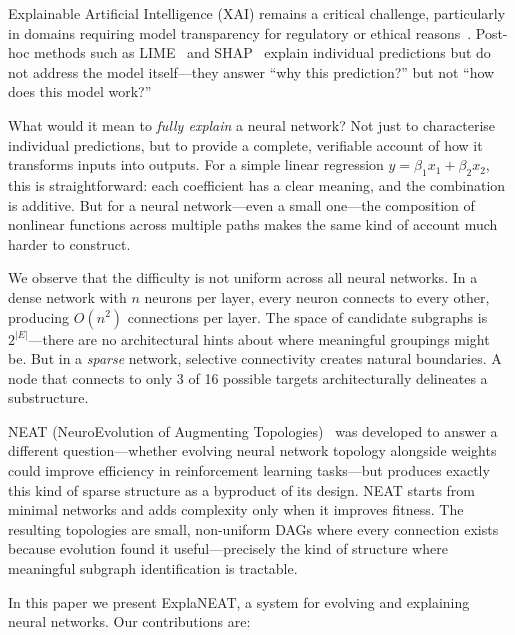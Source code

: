 \documentclass[11pt]{article}
\begin{document}
Explainable Artificial Intelligence (XAI) remains a critical challenge, particularly in domains requiring model transparency for regulatory or ethical reasons~\cite{doshi2017towards,guidotti2018survey}. Post-hoc methods such as LIME~\cite{ribeiro2016why} and SHAP~\cite{lundberg2017unified} explain individual predictions but do not address the model itself---they answer ``why this prediction?'' but not ``how does this model work?''

What would it mean to \emph{fully explain} a neural network? Not just to characterise individual predictions, but to provide a complete, verifiable account of how it transforms inputs into outputs. For a simple linear regression $y = \beta_1 x_1 + \beta_2 x_2$, this is straightforward: each coefficient has a clear meaning, and the combination is additive. But for a neural network---even a small one---the composition of nonlinear functions across multiple paths makes the same kind of account much harder to construct.

We observe that the difficulty is not uniform across all neural networks. In a dense network with $n$ neurons per layer, every neuron connects to every other, producing $O(n^2)$ connections per layer. The space of candidate subgraphs is $2^{|E|}$---there are no architectural hints about where meaningful groupings might be. But in a \emph{sparse} network, selective connectivity creates natural boundaries. A node that connects to only 3 of 16 possible targets architecturally delineates a substructure.

NEAT (NeuroEvolution of Augmenting Topologies)~\cite{stanley2002evolving} was developed to answer a different question---whether evolving neural network topology alongside weights could improve efficiency in reinforcement learning tasks---but produces exactly this kind of sparse structure as a byproduct of its design. NEAT starts from minimal networks and adds complexity only when it improves fitness. The resulting topologies are small, non-uniform DAGs where every connection exists because evolution found it useful---precisely the kind of structure where meaningful subgraph identification is tractable.

In this paper we present ExplaNEAT, a system for evolving and explaining neural networks. Our contributions are:
\end{document}
